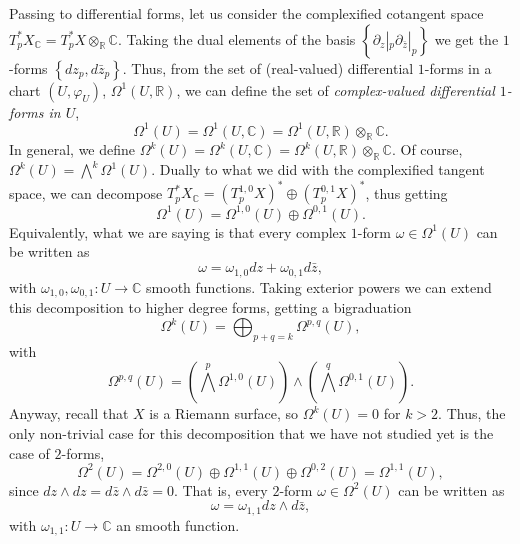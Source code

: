 \documentclass[12pt,a4paper]{book}
\theoremstyle{definition} \newtheorem{defn}[thm]{Definition}
\theoremstyle{definition} \newtheorem{ejemplo}[thm]{Example}
\theoremstyle{definition} \newtheorem{ejercicio}[thm]{Exercise}
\theoremstyle{remark} \newtheorem*{obs}{Remark}
\def\CC{\mathbb{C}}
\def\RR{\mathbb{R}}
\begin{document}
Passing to differential forms, let us consider the complexified cotangent space $T^*_p X_\CC = T^*_pX \otimes_\RR \CC$. Taking the dual elements of the basis $\left\{ \partial_z|_p \partial_{\bar{z}}|_p \right\}$ we get the $1$-forms $\left\{ dz_p, d\bar{z}_p \right\}$. Thus, from the set of (real-valued) differential $1$-forms in a chart $(U,\varphi_U)$, $\Omega^1(U,\RR)$, we can define the set of \emph{complex-valued differential $1$-forms in $U$}, 
\begin{equation*}
  \Omega^1(U)=\Omega^1(U,\CC)=\Omega^1(U,\RR) \otimes_\RR \CC.
\end{equation*}
In general, we define $\Omega^k(U)=\Omega^k(U,\CC) = \Omega^k(U,\RR) \otimes_\RR \CC$. Of course, $\Omega^k(U)=\bigwedge^k \Omega^1(U)$.
Dually to what we did with the complexified tangent space, we can decompose $T_p^*X_\CC = (T_p^{1,0}X)^* \oplus (T_p^{0,1}X)^*$, thus getting
\begin{equation*}
  \Omega^1(U)= \Omega^{1,0}(U) \oplus \Omega^{0,1}(U).
\end{equation*}
Equivalently, what we are saying is that every complex $1$-form $\omega \in \Omega^1(U)$ can be written as
\begin{equation*}
  \omega = \omega_{1,0} dz + \omega_{0,1} d\bar{z},
\end{equation*}
with $\omega_{1,0}, \omega_{0,1} : U \rightarrow \CC$ smooth functions.
Taking exterior powers we can extend this decomposition to higher degree forms, getting a bigraduation
\begin{equation*}
  \Omega^k(U)=\bigoplus_{p+q=k}\Omega^{p,q}(U),
\end{equation*}
with
\begin{equation*}
  \Omega^{p,q}(U)=\left( \bigwedge^p \Omega^{1,0}(U) \right) \wedge \left( \bigwedge^q \Omega^{0,1}(U) \right).
\end{equation*}
Anyway, recall that $X$ is a Riemann surface, so $\Omega^k(U)=0$ for $k>2$. Thus, the only non-trivial case for this decomposition that we have not studied yet is the case of $2$-forms,
\begin{equation*}
  \Omega^2(U)=\Omega^{2,0}(U) \oplus \Omega^{1,1}(U) \oplus \Omega^{0,2}(U)=\Omega^{1,1}(U),
\end{equation*}
since $dz\wedge dz = d\bar{z} \wedge d\bar{z} =0$.
That is, every $2$-form $\omega\in \Omega^2(U)$ can be written as
\begin{equation*}
  \omega = \omega_{1,1} dz \wedge d\bar{z},
\end{equation*}
with $\omega_{1,1}: U \rightarrow \CC$ an smooth function.
\end{document}
